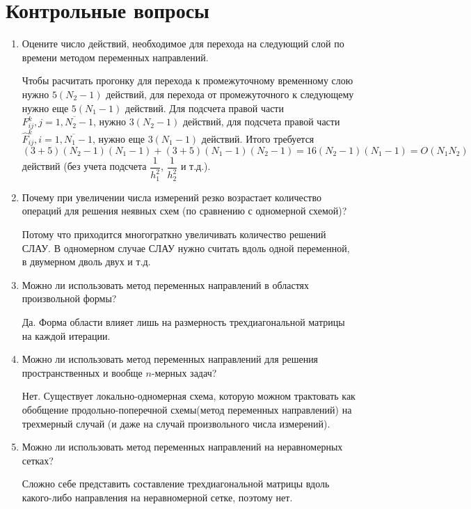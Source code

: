 \documentclass[12pt, a4paper]{article}
\begin{document}
\section{Контрольные вопросы}
\begin{enumerate}
\item Оцените число действий, необходимое для перехода на следующий слой по времени методом переменных направлений.

Чтобы расчитать прогонку для перехода к промежуточному временному слою нужно $5(N_2-1)$ действий, для перехода от промежуточного к следующему нужно еще $5(N_1-1)$ действий. Для подсчета правой части $F_{ij}^k, j = \overline{1,N_2-1}$, нужно $3(N_2 - 1)$ действий, для подсчета правой части $\hat{F}_{ij}^k, i = \overline{1,N_1-1}$, нужно еще $3(N_1 - 1)$ действий. Итого требуется
\[
(3 + 5)(N_2-1)(N_1-1) + (3 + 5)(N_1-1)(N_2 - 1) = 16(N_2-1)(N_1-1) = O(N_1N_2)
\]
действий (без учета подсчета $\dfrac{1}{h_1^2}$, $\dfrac{1}{h_2^2}$ и т.д.).

\item Почему при увеличении числа измерений резко возрастает количество операций для решения неявных схем (по сравнению с одномерной схемой)?

Потому что приходится многограткно увеличивать количество решений СЛАУ. В одномерном случае СЛАУ нужно считать вдоль одной переменной, в двумерном дволь двух и т.д.

\item Можно ли использовать метод переменных направлений в
областях произвольной формы?

Да. Форма области влияет лишь на размерность трехдиагональной матрицы на каждой итерации. 


\item Можно ли использовать метод переменных направлений для решения пространственных и вообще $n$-мерных задач?

Нет. Существует локально-одномерная схема, которую можном трактовать как обобщение продольно-поперечной схемы(метод переменных направлений) на трехмерный случай (и даже на случай произвольного числа измерений). 

\item Можно ли использовать метод переменных направлений на неравномерных сетках?

Сложно себе представить составление трехдиагональной матрицы вдоль какого-либо направления на неравномерной сетке, поэтому нет. 
\end{enumerate}


\newpage
\end{document}

